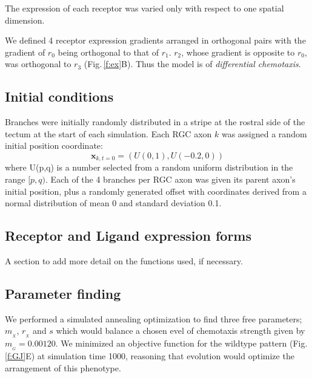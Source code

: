 \documentclass[9pt,lineno,draft]{elife}
\begin{document}
The expression of each receptor was varied only with respect to one spatial dimension.

We defined 4 receptor expression gradients arranged in orthogonal pairs with the gradient of $r_0$ being orthogonal to that of $r_1$. $r_2$, whose gradient is opposite to $r_0$, was orthogonal to $r_3$ (Fig.\,\ref{f:ex}B). Thus the model is of \emph{differential chemotaxis}.

\subsection*{Initial conditions}
Branches were initially randomly distributed in a stripe at the rostral side of the tectum at the start of each simulation.
Each RGC axon $k$ was assigned a random initial position coordinate:
\begin{equation}\label{e:ic}
\mathbf{x}_{k,t=0} = (U(0,1), U(-0.2,0))
\end{equation}
where U(p,q) is a number selected from a random uniform distribution in the range $[p,q)$. Each of the 4 branches per RGC axon was given its parent axon's initial position, plus a randomly generated offset with coordinates derived from a normal distribution of mean 0 and standard deviation 0.1.

\subsection*{Receptor and Ligand expression forms}

A section to add more detail on the functions used, if necessary.

\subsection*{Parameter finding}

We performed a simulated annealing optimization to find three free parameters; $m_{\!_X}$, $r_{\!_X}$ and $s$ which would balance a chosen evel of chemotaxis strength given by $m_{\!_G}=0.00120$.
We minimized an objective function for the wildtype pattern (Fig.\,\ref{f:GJ}E) at simulation time 1000, reasoning that evolution would optimize the arrangement of this phenotype.
\end{document}
